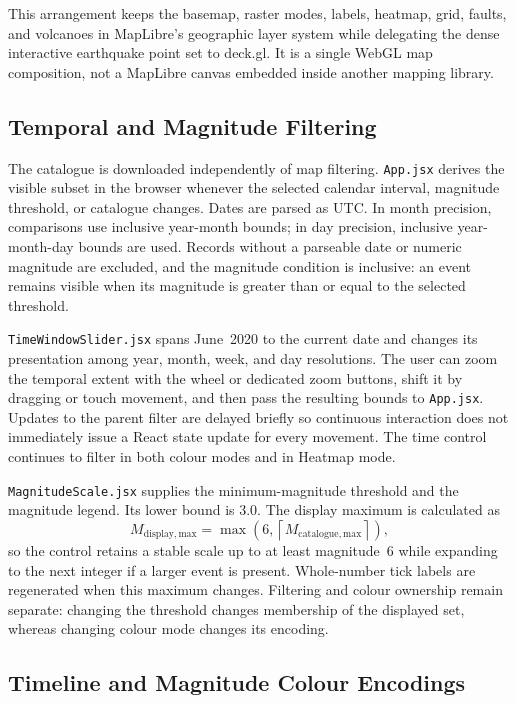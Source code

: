 \documentclass[12pt]{article}
\begin{document}
This arrangement keeps the basemap, raster modes, labels, heatmap, grid, faults, and volcanoes in MapLibre's geographic layer system while delegating the dense interactive earthquake point set to deck.gl. It is a single WebGL map composition, not a MapLibre canvas embedded inside another mapping library.

\subsection{Temporal and Magnitude Filtering}
\label{subsec:frontend_filtering}

The catalogue is downloaded independently of map filtering. \texttt{App.jsx} derives the visible subset in the browser whenever the selected calendar interval, magnitude threshold, or catalogue changes. Dates are parsed as UTC. In month precision, comparisons use inclusive year-month bounds; in day precision, inclusive year-month-day bounds are used. Records without a parseable date or numeric magnitude are excluded, and the magnitude condition is inclusive: an event remains visible when its magnitude is greater than or equal to the selected threshold.

\texttt{TimeWindowSlider.jsx} spans June~2020 to the current date and changes its presentation among year, month, week, and day resolutions. The user can zoom the temporal extent with the wheel or dedicated zoom buttons, shift it by dragging or touch movement, and then pass the resulting bounds to \texttt{App.jsx}. Updates to the parent filter are delayed briefly so continuous interaction does not immediately issue a React state update for every movement. The time control continues to filter in both colour modes and in Heatmap mode.

\texttt{MagnitudeScale.jsx} supplies the minimum-magnitude threshold and the magnitude legend. Its lower bound is 3.0. The display maximum is calculated as
\[
M_{\mathrm{display,max}}=\max\left(6,\left\lceil M_{\mathrm{catalogue,max}}\right\rceil\right),
\]
so the control retains a stable scale up to at least magnitude~6 while expanding to the next integer if a larger event is present. Whole-number tick labels are regenerated when this maximum changes. Filtering and colour ownership remain separate: changing the threshold changes membership of the displayed set, whereas changing colour mode changes its encoding.

\subsection{Timeline and Magnitude Colour Encodings}
\label{subsec:frontend_colour}
\end{document}
